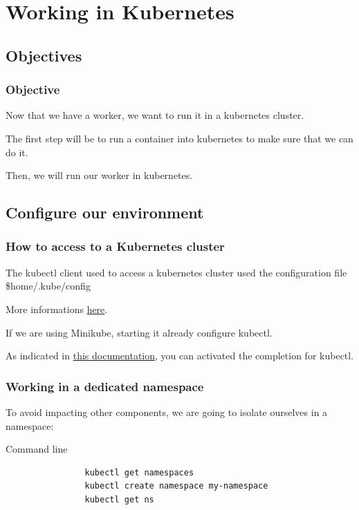 \section{Working in Kubernetes}

\subsection{Objectives}
	\begin{frame}
		\frametitle{Objective}
		Now that we have a worker, we want to run it in a kubernetes cluster.
		
		\bigskip
		The first step will be to run a container into kubernetes to make sure that we can do it.
		
		Then, we will run our worker in kubernetes.	
	\end{frame}
	
\subsection{Configure our environment}
	
	\begin{frame}
		\frametitle{How to access to a Kubernetes cluster}
		
		The kubectl client used to access a kubernetes cluster used the configuration file \$home/.kube/config
		
		More informations \href{https://kubernetes.io/docs/tasks/access-application-cluster/configure-access-multiple-clusters/}{here}.
		
		\bigskip
		
		If we are using Minikube, starting it already configure kubectl.
		
		\bigskip
		
		As indicated in \href{https://kubernetes.io/docs/tasks/tools/install-kubectl/\#enabling-shell-autocompletion}{this documentation}, you can activated the completion for kubectl.
		
	\end{frame}
	
	\begin{frame}[fragile]
		\frametitle{Working in a dedicated namespace}
		
		To avoid impacting other components, we are going to isolate ourselves in a namespace:
		\begin{block}{Command line}
			\begin{verbatim}
				kubectl get namespaces
				kubectl create namespace my-namespace
				kubectl get ns
			\end{verbatim}
		\end{block}
	\end{frame}
		
